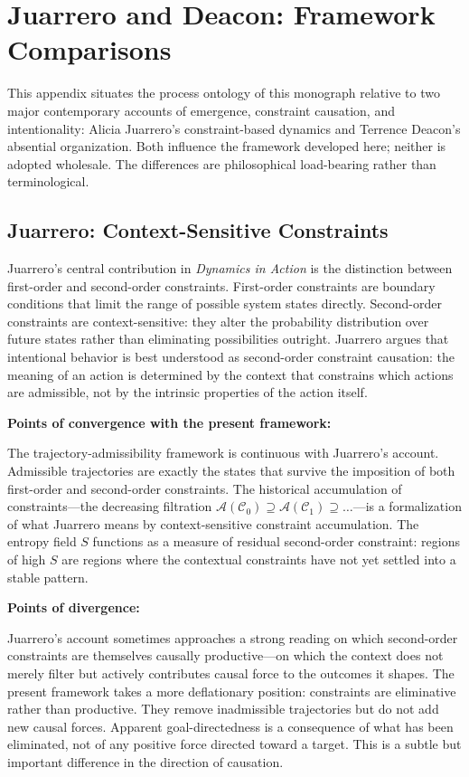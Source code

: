 \chapter{Juarrero and Deacon: Framework Comparisons}
\label{app:juarrero_deacon}

\noindent This appendix situates the process ontology of this monograph relative
to two major contemporary accounts of emergence, constraint causation, and
intentionality: Alicia Juarrero's constraint-based dynamics and Terrence Deacon's
absential organization. Both influence the framework developed here; neither
is adopted wholesale. The differences are philosophical load-bearing rather
than terminological.

\section{Juarrero: Context-Sensitive Constraints}

Juarrero's central contribution in \emph{Dynamics in Action} \citep{juarrero1999} is the
distinction between first-order and second-order constraints. First-order constraints
are boundary conditions that limit the range of possible system states directly.
Second-order constraints are context-sensitive: they alter the probability
distribution over future states rather than eliminating possibilities outright.
Juarrero argues that intentional behavior is best understood as second-order
constraint causation: the meaning of an action is determined by the context that
constrains which actions are admissible, not by the intrinsic properties of the
action itself.

\textbf{Points of convergence with the present framework:}

The trajectory-admissibility framework is continuous with Juarrero's account.
Admissible trajectories are exactly the states that survive the imposition of
both first-order and second-order constraints. The historical accumulation of
constraints---the decreasing filtration $\mathcal{A}(\mathcal{C}_0) \supseteq
\mathcal{A}(\mathcal{C}_1) \supseteq \ldots$---is a formalization of what
Juarrero means by context-sensitive constraint accumulation. The \RSVP entropy
field $S$ functions as a measure of residual second-order constraint: regions
of high $S$ are regions where the contextual constraints have not yet settled
into a stable pattern.

\textbf{Points of divergence:}

Juarrero's account sometimes approaches a strong reading on which second-order
constraints are themselves causally productive---on which the context does not
merely filter but actively contributes causal force to the outcomes it shapes.
The present framework takes a more deflationary position: constraints are
eliminative rather than productive. They remove inadmissible trajectories but
do not add new causal forces. Apparent goal-directedness is a consequence of
what has been eliminated, not of any positive force directed toward a target.
This is a subtle but important difference in the direction of causation.

